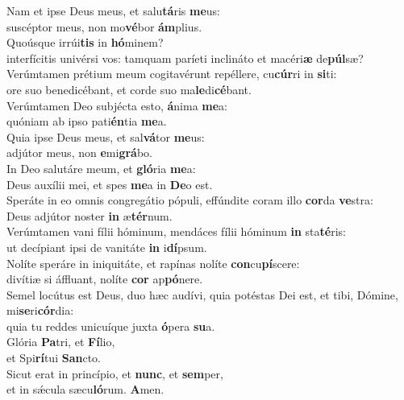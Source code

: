 \evenverse Nam et ipse Deus meus, et salu\textbf{tá}ris \textbf{me}us:~\*\\
\evenverse suscéptor meus, non mo\textbf{vé}bor \textbf{ám}plius.\\
\oddverse Quoúsque irrúi\textbf{tis} in \textbf{hó}minem?~\*\\
\oddverse interfícitis univérsi vos: tamquam paríeti inclináto et macéri\textbf{æ} de\textbf{púl}sæ?\\
\evenverse Verúmtamen prétium meum cogitavérunt repéllere, cu\textbf{cúr}ri in \textbf{si}ti:~\*\\
\evenverse ore suo benedicébant, et corde suo ma\textbf{le}di\textbf{cé}bant.\\
\oddverse Verúmtamen Deo subjécta esto, \textbf{á}nima \textbf{me}a:~\*\\
\oddverse quóniam ab ipso pati\textbf{én}tia \textbf{me}a.\\
\evenverse Quia ipse Deus meus, et sal\textbf{vá}tor \textbf{me}us:~\*\\
\evenverse adjútor meus, non \textbf{e}mi\textbf{grá}bo.\\
\oddverse In Deo salutáre meum, et \textbf{gló}ria \textbf{me}a:~\*\\
\oddverse Deus auxílii mei, et spes \textbf{me}a in \textbf{De}o est.\\
\evenverse Speráte in eo omnis congregátio pópuli, effúndite coram illo \textbf{cor}da \textbf{ve}stra:~\*\\
\evenverse Deus adjútor noster \textbf{in} æ\textbf{tér}num.\\
\oddverse Verúmtamen vani fílii hóminum, mendáces fílii hóminum \textbf{in} sta\textbf{té}ris:~\*\\
\oddverse ut decípiant ipsi de vanitáte \textbf{in} i\textbf{dí}psum.\\
\evenverse Nolíte speráre in iniquitáte, et rapínas nolíte \textbf{con}cu\textbf{pí}scere:~\*\\
\evenverse divítiæ si áffluant, nolíte \textbf{cor} ap\textbf{pó}nere.\\
\oddverse Semel locútus est Deus, duo hæc audívi, quia potéstas Dei est, et tibi, Dómine, mi\textbf{se}ri\textbf{cór}dia:~\*\\
\oddverse quia tu reddes unicuíque juxta \textbf{ó}pera \textbf{su}a.\\
\evenverse Glória \textbf{Pa}tri, et \textbf{Fí}lio,~\*\\
\evenverse et Spi\textbf{rí}tui \textbf{San}cto.\\
\oddverse Sicut erat in princípio, et \textbf{nunc}, et \textbf{sem}per,~\*\\
\oddverse et in sǽcula sæcu\textbf{ló}rum. \textbf{A}men.\\

